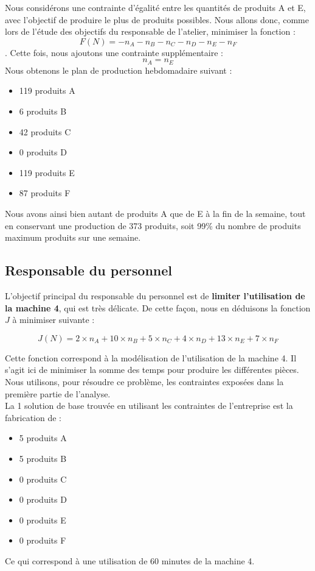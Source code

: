 \documentclass[a4paper,10pt]{article}
\begin{document}
Nous considérons une contrainte d'égalité entre les quantités de produits A et E, avec l'objectif de produire le plus de produits possibles. Nous allons donc, comme lors de l'étude des objectifs du responsable de l'atelier, minimiser la fonction :
$$F(N) = - n_A - n_B - n_C - n_D - n_E - n_F$$.
Cette fois, nous ajoutons une contrainte supplémentaire :
$$n_A = n_E$$
Nous obtenons le plan de production hebdomadaire suivant :
\begin{itemize}
\item[\textbullet] 119 produits A
\item[\textbullet] 6 produits B
\item[\textbullet] 42 produits C
\item[\textbullet] 0 produits D
\item[\textbullet] 119 produits E
\item[\textbullet] 87 produits F\newline
\end{itemize}

Nous avons ainsi bien autant de produits A que de E à la fin de la semaine, tout en conservant une production de 373 produits, soit 99\% du nombre de produits maximum produits sur une semaine.



\subsection{Responsable du personnel}

L'objectif principal du responsable du personnel est de \textbf{limiter l'utilisation de la machine 4}, qui est très délicate. De cette façon, nous en déduisons la fonction $J$ à minimiser suivante :

$$J(N)=2 \times n_A + 10 \times n_B + 5 \times n_C + 4 \times n_D + 13 \times n_E + 7 \times n_F$$

Cette fonction correspond à la modélisation de l'utilisation de la machine 4. Il s'agit ici de minimiser la somme des temps pour produire les différentes pièces. Nous utilisons, pour résoudre ce problème, les contraintes exposées dans la première partie de l'analyse.\\

La 1\iere{} solution de base trouvée en utilisant les contraintes de l'entreprise est la fabrication de :\newline
\begin{itemize}
\item[\textbullet] 5 produits A
\item[\textbullet] 5 produits B
\item[\textbullet] 0 produits C
\item[\textbullet] 0 produits D
\item[\textbullet] 0 produits E
\item[\textbullet] 0 produits F\newline
\end{itemize}
Ce qui correspond à une utilisation de 60 minutes de la machine 4.\newline
\end{document}
